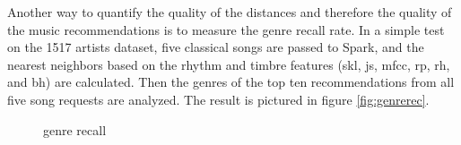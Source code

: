 Another way to quantify the quality of the distances and therefore the quality of the music recommendations is to measure the genre recall rate. In a simple test on the 1517 artists dataset, five classical songs are passed to Spark, and the nearest neighbors based on the rhythm and timbre features (skl, js, mfcc, rp, rh, and bh) are calculated. Then the genres of the top ten recommendations from all five song requests are analyzed. The result is pictured in figure \ref{fig:genrerec}.  

\begin{figure}[htbp]
	\centering
	\caption{genre recall}
	\label{fig:1517gen}
\end{figure}

